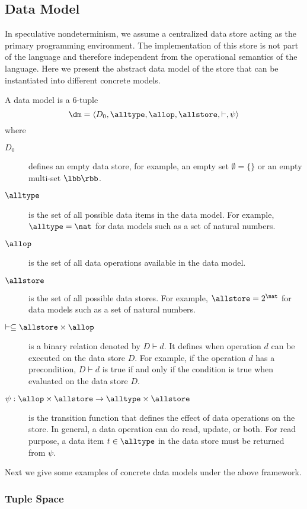 \subsection{Data Model}\label{sec:datamodel}

In speculative nondeterminism, we assume a 
centralized data store acting as the primary programming environment. The implementation of this store is
not part of the language and therefore independent from the operational semantics of the language.
Here we present the abstract data model of the store that can be instantiated into different
concrete models.

A data model is a 6-tuple
$$\dm=\langle D_0,\alltype,\allop,\allstore,\vdash,\psi\rangle$$
where
\begin{description}
  \item[$D_0$] defines an empty data store, for example, 
    an empty set $\emptyset=\{\}$ or an empty multi-set $\lbb\rbb$.
  \item[$\alltype$] is the set of all possible data items in the data model.
    For example, $\alltype=\nat$ for data models such as a set of natural numbers. 
  \item[$\allop$] is the set of all data operations available in the data model.
  \item[$\allstore$] is the set of all possible data stores.
    For example, $\allstore=2^\nat$ for data models such as a set of natural numbers.
  \item[$\vdash\subseteq\allstore\times\allop$] is a binary relation denoted by $D\vdash d$.
    It defines when operation $d$ can be executed on the data store $D$.
    For example, if the operation $d$ has a precondition, $D\vdash d$ is
    true if and only if the condition is true when evaluated on the data store $D$.
  \item[$\psi:\allop\times\allstore\to\alltype\times\allstore$] is the transition function that
    defines the effect of data operations on the store. 
    In general, a data operation can do read, update, or both. 
    For read purpose, a data item $t\in\alltype$ in the data store must be returned from $\psi$. 
\end{description}

Next we give some examples of concrete data models under the above framework.

\subsubsection*{Tuple Space}

